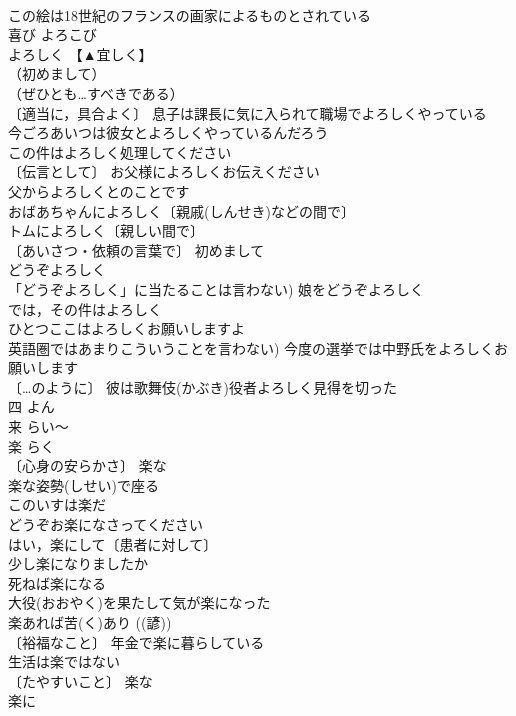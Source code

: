 \documentclass[8pt]{extreport}
\begin{document}
\begin{CJK}{UTF8}{min}
\\	この絵は18世紀のフランスの画家によるものとされている 
\\	喜び	よろこび	
\\	よろしく	【▲宜しく】	
\\	（初めまして）
\\	（ぜひとも…すべきである）
\\	〔適当に，具合よく〕 息子は課長に気に入られて職場でよろしくやっている 
\\	今ごろあいつは彼女とよろしくやっているんだろう 
\\	この件はよろしく処理してください 
\\	〔伝言として〕 お父様によろしくお伝えください 
\\	父からよろしくとのことです 
\\	おばあちゃんによろしく〔親戚(しんせき)などの間で〕 
\\	トムによろしく〔親しい間で〕 
\\	〔あいさつ・依頼の言葉で〕 初めまして
\\	どうぞよろしく 
\\	「どうぞよろしく」に当たることは言わない) 娘をどうぞよろしく 
\\	では，その件はよろしく 
\\	ひとつここはよろしくお願いしますよ 
\\	英語圏ではあまりこういうことを言わない) 今度の選挙では中野氏をよろしくお願いします 
\\	〔…のように〕 彼は歌舞伎(かぶき)役者よろしく見得を切った 
\\	四	よん	
\\	来	らい～	
\\	楽	らく	
\\	〔心身の安らかさ〕 楽な 
\\	楽な姿勢(しせい)で座る 
\\	このいすは楽だ 
\\	どうぞお楽になさってください 
\\	はい，楽にして〔患者に対して〕 
\\	少し楽になりましたか 
\\	死ねば楽になる 
\\	大役(おおやく)を果たして気が楽になった 
\\	楽あれば苦(く)あり ((諺)) 
\\	〔裕福なこと〕 年金で楽に暮らしている 
\\	生活は楽ではない 
\\	〔たやすいこと〕 楽な 
\\	楽に 

\end{CJK}
\end{document}
